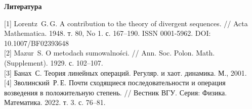 \documentclass[14pt, a4paper]{extbook}
\begin{document}
\begin{center}
{\small \bf Литература}
\end{center}
\small
	{[1]}
	{Lorentz~G.\,G.} A contribution to the theory of divergent sequences.
	// Acta Mathematica. 1948. т. 80, No 1. с. 167--190. ISSN 0001-5962.
	DOI: 10.1007/BF02393648
	\\
	{[2]}
	{Mazur~S.} O metodach sumowalności. // Ann. Soc. Polon. Math.
	(Supplement). 1929. с. 102--107.
	\\
	{[3]}
	{Банах~С.} Теория линейных операций. Регуляр. и хаот.
	динамика. М., 2001.
	\\
	{[4]}
	Зволинский~Р.\,Е. Почти сходящиеся последовательности и операция
	возведения в положительную степень. // Вестник ВГУ. Серия: Физика.
	Математика. 2022. т. 3. с. 76--81.
\end{document}
